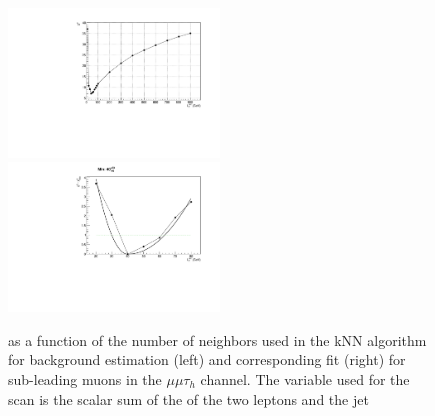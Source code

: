 \begin{figure}
\includegraphics[width=0.5\textwidth]{4_Analisys/pics/8TeV/ProfileNeighbors/MM/h2taucuts020/LT_chi2.pdf}
\includegraphics[width=0.5\textwidth]{4_Analisys/pics/8TeV/ProfileNeighbors/MM/h2taucuts020_LT.pdf} \\
\caption{\chisq as a function of the number of neighbors used in the kNN algorithm for background estimation 
(left) and corresponding fit (right) for sub-leading muons in the $\mu\mu\tau_h$ channel. The variable used for the scan is the scalar sum of the \pT of the two leptons and the jet}
\label{fig:kNN_minima_sample}
\end{figure}

